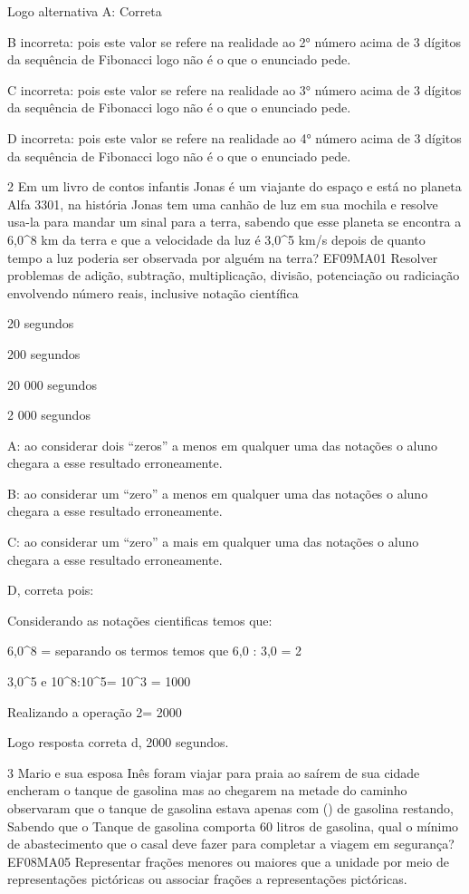 Logo alternativa A: Correta

B incorreta: pois este valor se refere na realidade ao 2° número acima
de 3 dígitos da sequência de Fibonacci logo não é o que o enunciado
pede.

C incorreta: pois este valor se refere na realidade ao 3° número acima
de 3 dígitos da sequência de Fibonacci logo não é o que o enunciado
pede.

D incorreta: pois este valor se refere na realidade ao 4° número acima
de 3 dígitos da sequência de Fibonacci logo não é o que o enunciado
pede.

\num{2} Em um livro de contos infantis Jonas é um viajante do espaço e está
no planeta Alfa 3301, na história Jonas tem uma canhão de luz em sua
mochila e resolve usa-la para mandar um sinal para a terra, sabendo que
esse planeta se encontra a 6,0^8
km da terra e que a velocidade da luz é 3,0^5 km/s depois de quanto tempo a luz poderia ser
observada por alguém na terra? EF09MA01 Resolver problemas de adição,
subtração, multiplicação, divisão, potenciação ou radiciação envolvendo
número reais, inclusive notação científica

\item 20 segundos
\item 200 segundos
\item 20 000 segundos
\item 2 000 segundos

A: ao considerar dois ``zeros'' a menos em qualquer uma das notações o
aluno chegara a esse resultado erroneamente.

B: ao considerar um ``zero'' a menos em qualquer uma das notações o
aluno chegara a esse resultado erroneamente.

C: ao considerar um ``zero'' a mais em qualquer uma das notações o aluno
chegara a esse resultado erroneamente.

D, correta pois:

Considerando as notações cientificas temos que:

6,0^8 = separando os termos temos
que 6,0 : 3,0 = 2

3,0^5 e
10^8:10^5= 10^3 =
1000

Realizando a operação 2= 2000

Logo resposta correta d, 2000 segundos.

\num{3} Mario e sua esposa Inês foram viajar para praia ao saírem de sua
cidade encheram o tanque de gasolina mas ao chegarem na metade do
caminho observaram que o tanque de gasolina estava apenas com
() de gasolina restando, Sabendo que o Tanque de gasolina
comporta 60 litros de gasolina, qual o mínimo de abastecimento que o
casal deve fazer para completar a viagem em segurança? EF08MA05
Representar frações menores ou maiores que a unidade por meio de
representações pictóricas ou associar frações a representações
pictóricas.

